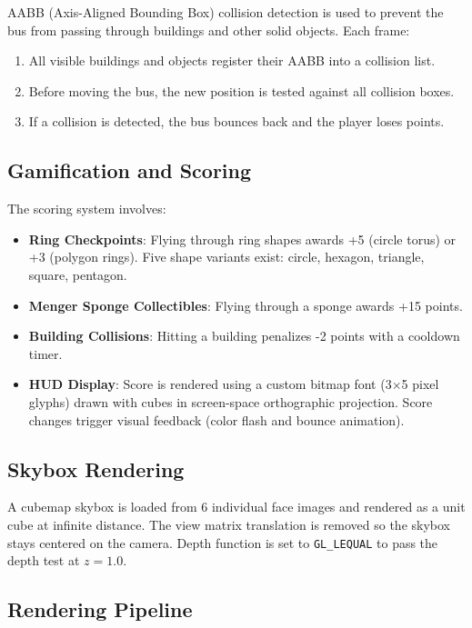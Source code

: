 \documentclass[12pt,a4paper]{article}
\begin{document}
AABB (Axis-Aligned Bounding Box) collision detection is used to prevent the bus from passing through buildings and other solid objects. Each frame:

\begin{enumerate}
    \item All visible buildings and objects register their AABB into a collision list.
    \item Before moving the bus, the new position is tested against all collision boxes.
    \item If a collision is detected, the bus bounces back and the player loses points.
\end{enumerate}

\subsection{Gamification and Scoring}

The scoring system involves:
\begin{itemize}
    \item \textbf{Ring Checkpoints}: Flying through ring shapes awards +5 (circle torus) or +3 (polygon rings). Five shape variants exist: circle, hexagon, triangle, square, pentagon.
    \item \textbf{Menger Sponge Collectibles}: Flying through a sponge awards +15 points.
    \item \textbf{Building Collisions}: Hitting a building penalizes -2 points with a cooldown timer.
    \item \textbf{HUD Display}: Score is rendered using a custom bitmap font (3$\times$5 pixel glyphs) drawn with cubes in screen-space orthographic projection. Score changes trigger visual feedback (color flash and bounce animation).
\end{itemize}

\subsection{Skybox Rendering}

A cubemap skybox is loaded from 6 individual face images and rendered as a unit cube at infinite distance. The view matrix translation is removed so the skybox stays centered on the camera. Depth function is set to \texttt{GL\_LEQUAL} to pass the depth test at $z = 1.0$.

\subsection{Rendering Pipeline}
\end{document}
